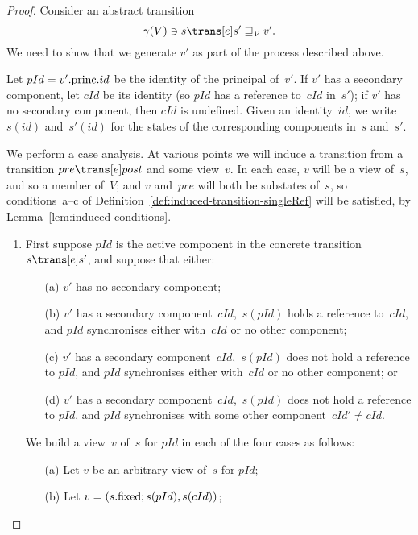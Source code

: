 \begin{proof}
Consider an abstract transition
\[
\gamma(V) \ni s \trans[e] s' \sqge_{\V} v'.
\]
We need to show that we generate $v'$ as part of the process described above.

Let $pId = v'.\mathrm{princ}.id$ be the identity of the principal of~$v'$.  If $v'$
has a secondary component, let $cId$ be its identity (so $pId$ has a
reference to~$cId$ in~$s'$); if $v'$ has no secondary component, then $cId$ is
undefined.  Given an identity~$id$, we write $s(id)$ and~$s'(id)$ for the
states of the corresponding components in~$s$ and~$s'$.

We perform a case analysis.  At various points we will induce a transition
from a transition $pre \trans[e] post$ and some view~$v$.  In each
case, $v$ will be a view of~$s$, and so a member of~$V$; and $v$ and~$pre$
will both be substates of~$s$, so conditions~a--c of
Definition~\ref{def:induced-transition-singleRef} will be satisfied, by
Lemma~\ref{lem:induced-conditions}.
%
\begin{enumerate}
\item
First suppose $pId$ is the active component in the concrete transition \( {s
  \trans[e] s'} \), and suppose that either: 
\begin{enumerate}
\item[(a)] $v'$ has no secondary component; 

\item[(b)] $v'$ has a secondary component~$cId$,\, $s(pId)$ holds a reference
  to~$cId$, and $pId$ synchronises either with~$cId$ or no other component;
  
\item[(c)] $v'$ has a secondary component~$cId$,\, $s(pId)$ does not hold a
  reference to $pId$, and $pId$ synchronises either with~$cId$ or no other
  component; or

\item[(d)] $v'$ has a secondary component~$cId$,\, $s(pId)$ does not
  hold a reference to $pId$, and $pId$ synchronises with some other
  component~$cId' \ne cId$.
\end{enumerate}

We build a view~$v$ of~$s$ for $pId$ in each of the four cases as follows:
\begin{enumerate}
\item[(a)] Let $v$ be an arbitrary view of~$s$ for $pId$;

\item[(b)] Let $v = (s.\mathrm{fixed}; s(pId), s(cId))$;


\end{enumerate}
\end{enumerate}
\end{proof}
